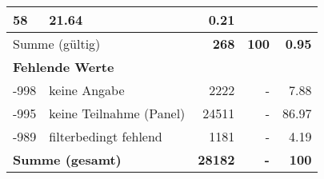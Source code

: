 \begin{longtable}{lXrrr}
       \num{58} &
       \num[round-mode=places,round-precision=2]{21,64} &
         \num[round-mode=places,round-precision=2]{0,21} \\
     \midrule
     \multicolumn{2}{l}{Summe (gültig)} &
       \textbf{\num{268}} &
     \textbf{100} &
       \textbf{\num[round-mode=places,round-precision=2]{0,95}} \\
     \multicolumn{5}{l}{\textbf{Fehlende Werte}}\\
       -998 &
       keine Angabe &
         \num{2222} &
        - &
         \num[round-mode=places,round-precision=2]{7,88} \\
       -995 &
       keine Teilnahme (Panel) &
         \num{24511} &
        - &
         \num[round-mode=places,round-precision=2]{86,97} \\
       -989 &
       filterbedingt fehlend &
         \num{1181} &
        - &
         \num[round-mode=places,round-precision=2]{4,19} \\
     \midrule
     \multicolumn{2}{l}{\textbf{Summe (gesamt)}} &
          \textbf{\num{28182}} &
        \textbf{-} &
        \textbf{100} \\
     \bottomrule
     \end{longtable}
     
